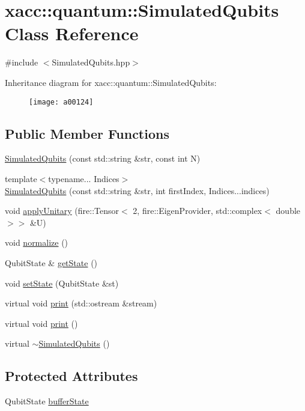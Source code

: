 \hypertarget{a00124}{}\section{xacc\+:\+:quantum\+:\+:Simulated\+Qubits Class Reference}
\label{a00124}


{\ttfamily \#include $<$Simulated\+Qubits.\+hpp$>$}

Inheritance diagram for xacc\+:\+:quantum\+:\+:Simulated\+Qubits\+:\begin{figure}[H]
\begin{center}
\leavevmode
\texttt{[image: a00124]}
\end{center}
\end{figure}
\subsection*{Public Member Functions}
\begin{DoxyCompactItemize}
\item 
\hyperlink{a00124_abb0419229628210a1c187b76be6edc30}{Simulated\+Qubits} (const std\+::string \&str, const int N)
\item 
{\footnotesize template$<$typename... Indices$>$ }\\\hyperlink{a00124_ae11d09c17316adb09b93cc866969dba8}{Simulated\+Qubits} (const std\+::string \&str, int first\+Index, Indices...\+indices)
\item 
void \hyperlink{a00124_a3f4518d0135101141bf92d7e31f4fddc}{apply\+Unitary} (fire\+::\+Tensor$<$ 2, fire\+::\+Eigen\+Provider, std\+::complex$<$ double $>$$>$ \&U)
\item 
void \hyperlink{a00124_a09ee499769bb1eedaf08d6b5c29f9791}{normalize} ()
\item 
Qubit\+State \& \hyperlink{a00124_a405577717ca200ed9e524c04209e0216}{get\+State} ()
\item 
void \hyperlink{a00124_a8cd74c239c1fcecb3d03d6989732d5fe}{set\+State} (Qubit\+State \&st)
\item 
virtual void \hyperlink{a00124_a9252d30be0563f36bf1ff839c7104cd7}{print} (std\+::ostream \&stream)
\item 
virtual void \hyperlink{a00124_a32922bd2ccc64bba601c07a3c136cc3d}{print} ()
\item 
virtual \hyperlink{a00124_aebf6f30a6d8c84971091d87908680e7e}{$\sim$\+Simulated\+Qubits} ()
\end{DoxyCompactItemize}
\subsection*{Protected Attributes}
\begin{DoxyCompactItemize}
\item 
Qubit\+State \hyperlink{a00124_a630bea50ee06fd59f74450f01f95e489}{buffer\+State}
\end{DoxyCompactItemize}


